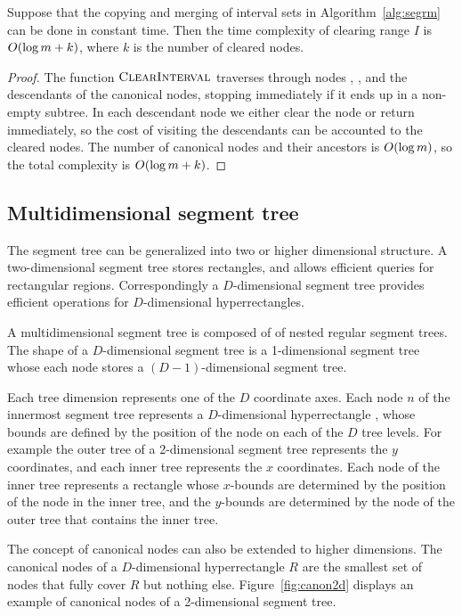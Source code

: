 \documentclass[english,gradu]{tktltiki2018}
\begin{document}
\begin{lem}\label{lem:segrmtime}Suppose that the copying and merging of interval sets in Algorithm~\ref{alg:segrm} can be done in constant time.
Then the time complexity of clearing range $I$ is $O(\log m + k)$, where $k$ is the number of cleared nodes.\end{lem}
\begin{proof}
The function $\textsc{ClearInterval}$ traverses through nodes , , and the descendants of the canonical nodes, stopping immediately if it ends up in a non-empty subtree.
In each descendant node we either clear the node or return immediately, so the cost of visiting the descendants can be accounted to the cleared nodes.
The number of canonical nodes and their ancestors is $O(\log m)$, so the total complexity is $O(\log m + k)$.
\end{proof}


\subsection{Multidimensional segment tree}

The segment tree can be generalized into two or higher dimensional structure.
A two-dimensional segment tree stores rectangles, and allows efficient queries for rectangular regions.
Correspondingly a $D$-dimensional segment tree provides efficient operations for $D$-dimensional hyperrectangles.

A multidimensional segment tree is composed of of nested regular segment trees.
The shape of a $D$-dimensional segment tree is a 1-dimensional segment tree whose each node stores a $(D-1)$-dimensional segment tree.

Each tree dimension represents one of the $D$ coordinate axes.
Each node $n$ of the innermost segment tree represents a $D$-dimensional hyperrectangle , whose bounds are defined by the position of the node on each of the $D$ tree levels.
For example the outer tree of a 2-dimensional segment tree represents the $y$ coordinates, and each inner tree represents the $x$ coordinates.
Each node of the inner tree represents a rectangle whose $x$-bounds are determined by the position of the node in the inner tree, and the $y$-bounds are determined by the node of the outer tree that contains the inner tree.

The concept of canonical nodes can also be extended to higher dimensions.
The canonical nodes  of a $D$-dimensional hyperrectangle $R$ are the smallest set of nodes that fully cover $R$ but nothing else.
Figure~\ref{fig:canon2d} displays an example of canonical nodes of a 2-dimensional segment tree.
\end{document}

